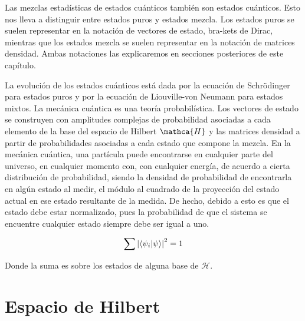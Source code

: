 Las mezclas estadísticas de estados cuánticos también son estados cuánticos. Esto nos lleva a distinguir entre estados puros y estados mezcla. Los estados puros se suelen representar en la notación de vectores de estado, bra-kets de Dirac, mientras que los estados mezcla se suelen representar en la notación de matrices densidad. Ambas notaciones las explicaremos en secciones posteriores de este capítulo.

La evolución de los estados cuánticos está dada por la ecuación de Schrödinger para estados puros y por la ecuación de Liouville-von Neumann para estados mixtos. La mecánica cuántica es una teoría probabilística. Los vectores de estado se construyen con amplitudes complejas de probabilidad asociadas a cada elemento de la base del espacio de Hilbert $\mathca{H}$ y las matrices densidad a partir de probabilidades asociadas a cada estado que compone la mezcla. En la mecánica cuántica, una partícula puede encontrarse en cualquier parte del universo, en cualquier momento con, con cualquier energía, de acuerdo a cierta distribución de probabilidad, siendo la densidad de probabilidad de encontrarla en algún estado al medir, el módulo al cuadrado de la proyección del estado actual en ese estado resultante de la medida. De hecho, debido a esto es que el estado debe estar normalizado, pues la probabilidad de que el sistema se encuentre cualquier estado siempre debe ser igual a uno.

\begin{equation}
    \sum\limits \abs{\braket{\psi_i}{\psi}}^2 = 1
\end{equation}

Donde la suma es sobre los estados de alguna base de $\mathcal{H}$.%

\section{Espacio de Hilbert}

